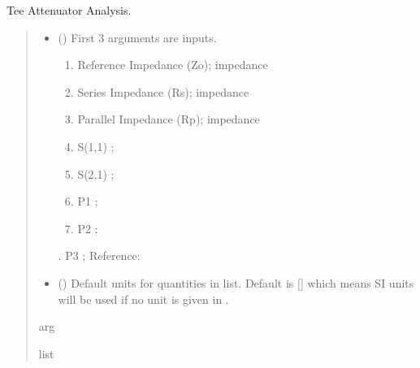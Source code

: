 \documentclass[letterpaper,10pt,english]{sphinxmanual}
\begin{document}

\begin{fulllineitems}
\label{\detokenize{components:components.Tee_Attenuator_Analysis}}
\pysigstartsignatures
{}
\pysigstopsignatures
\sphinxAtStartPar
Tee Attenuator Analysis.
\begin{quote}\begin{description}
\begin{itemize}
\item {} 
\sphinxAtStartPar
{} () \textendash{} 
\sphinxAtStartPar
First 3 arguments are inputs.
\begin{enumerate}
%
\item {} 
\sphinxAtStartPar
Reference Impedance (Zo); impedance

\item {} 
\sphinxAtStartPar
Series Impedance (Rs); impedance

\item {} 
\sphinxAtStartPar
Parallel Impedance (Rp); impedance

\item {} 
\sphinxAtStartPar
S(1,1) ;

\item {} 
\sphinxAtStartPar
S(2,1) ;

\item {} 
\sphinxAtStartPar
P1 ;

\item {} 
\sphinxAtStartPar
P2 ;

\end{enumerate}

. P3 ;
Reference:


\item {} 
\sphinxAtStartPar
{} (\sphinxstyleliteralemphasis{\sphinxupquote{, }}) \textendash{} Default units for quantities in  list. Default is {[}{]} which means SI units will be used if no unit is given in .

\end{itemize}

\sphinxAtStartPar
arg

\sphinxAtStartPar
list

\end{description}\end{quote}

\end{fulllineitems}
\end{document}
